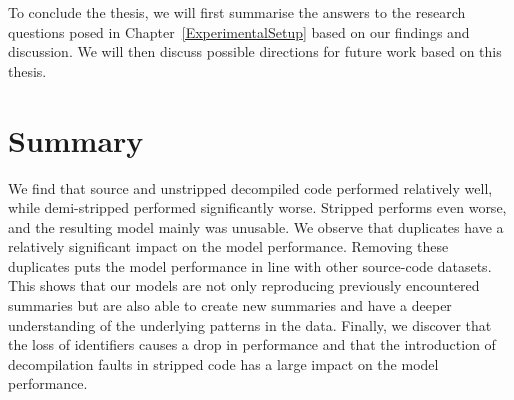 To conclude the thesis, we will first summarise the answers to the research questions posed in Chapter~\ref{ExperimentalSetup} based on our findings and discussion. We will then discuss possible directions for future work based on this thesis. 
\section{Summary}
We find that source and unstripped decompiled code performed relatively well, while demi-stripped performed significantly worse. Stripped performs even worse, and the resulting model mainly was unusable. We observe that duplicates have a relatively significant impact on the model performance. Removing these duplicates puts the model performance in line with other source-code datasets. This shows that our models are not only reproducing previously encountered summaries but are also able to create new summaries and have a deeper understanding of the underlying patterns in the data. Finally, we discover that the loss of identifiers causes a drop in performance and that the introduction of decompilation faults in stripped code has a large impact on the model performance.

